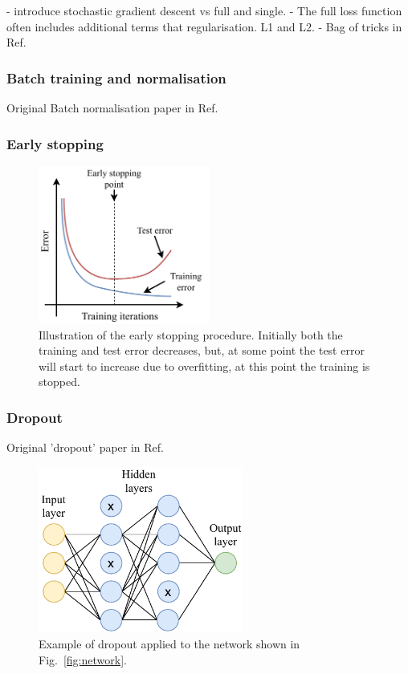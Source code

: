 - introduce stochastic gradient descent vs full and single.
- The full loss function often includes additional terms that regularisation. L1 and L2.
- Bag of tricks in Ref.~\cite{he2019}

\subsubsection*{Batch training and normalisation}
Original Batch normalisation paper in Ref.~\cite{ioffe2015}

\subsubsection*{Early stopping}

\begin{figure} %
    \includegraphics[width=0.5\textwidth]{diagrams/6-cvn/early_stopping.pdf}
    \caption[Illustration of the early stopping procedure.]
    {Illustration of the early stopping procedure. Initially both the training and test error
        decreases, but, at some point the test error will start to increase due to overfitting, at
        this point the training is stopped.}
    \label{fig:early_stopping}
\end{figure}

\subsubsection*{Dropout}

Original 'dropout' paper in Ref.~\cite{hinton2012}
\begin{figure} %
    \includegraphics[width=0.6\textwidth]{diagrams/6-cvn/dropout.pdf}
    \caption[dropout short]
    {Example of dropout applied to the network shown in Fig.~\ref{fig:network}.}
    \label{fig:dropout}
\end{figure}

